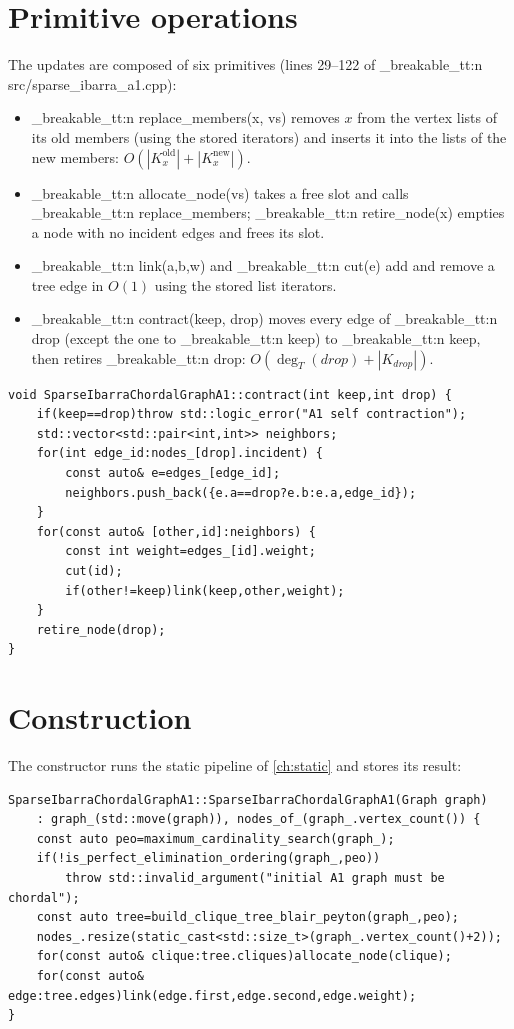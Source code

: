 \documentclass[11pt,a4paper,oneside]{report}
\theoremstyle{plain}
\theoremstyle{definition}
\theoremstyle{remark}
\DeclareRobustCommand{\code}[1]{\mtp_breakable_tt:n {#1}}
\DeclareRobustCommand{\file}[1]{\mtp_breakable_tt:n {#1}}
\begin{document}
\section{Primitive operations}
The updates are composed of six primitives (lines 29--122 of \file{src/sparse_ibarra_a1.cpp}):
\begin{itemize}
\item \code{replace_members(x, vs)} removes \(x\) from the vertex lists of its old members
  (using the stored iterators) and inserts it into the lists of the new members:
  \(O(|K_x^{\text{old}}|+|K_x^{\text{new}}|)\).
\item \code{allocate_node(vs)} takes a free slot and calls \code{replace_members};
  \code{retire_node(x)} empties a node with no incident edges and frees its slot.
\item \code{link(a,b,w)} and \code{cut(e)} add and remove a tree edge in \(O(1)\) using the
  stored list iterators.
\item \code{contract(keep, drop)} moves every edge of \code{drop} (except the one to
  \code{keep}) to \code{keep}, then retires \code{drop}:
  \(O(\deg_T(\mathit{drop})+|K_{\mathit{drop}}|)\).
\end{itemize}

\begin{lstlisting}[style=cpp,firstnumber=109,caption={\file{src/sparse_ibarra_a1.cpp}, lines 109--122: contracting a tree edge.},label={lst:a1-contract}]
void SparseIbarraChordalGraphA1::contract(int keep,int drop) {
    if(keep==drop)throw std::logic_error("A1 self contraction");
    std::vector<std::pair<int,int>> neighbors;
    for(int edge_id:nodes_[drop].incident) {
        const auto& e=edges_[edge_id];
        neighbors.push_back({e.a==drop?e.b:e.a,edge_id});
    }
    for(const auto& [other,id]:neighbors) {
        const int weight=edges_[id].weight;
        cut(id);
        if(other!=keep)link(keep,other,weight);
    }
    retire_node(drop);
}
\end{lstlisting}

\section{Construction}
The constructor runs the static pipeline of \cref{ch:static} and stores its result:

\begin{lstlisting}[style=cpp,firstnumber=12,caption={\file{src/sparse_ibarra_a1.cpp}, lines 12--21: the A1 constructor.},label={lst:a1-ctor}]
SparseIbarraChordalGraphA1::SparseIbarraChordalGraphA1(Graph graph)
    : graph_(std::move(graph)), nodes_of_(graph_.vertex_count()) {
    const auto peo=maximum_cardinality_search(graph_);
    if(!is_perfect_elimination_ordering(graph_,peo))
        throw std::invalid_argument("initial A1 graph must be chordal");
    const auto tree=build_clique_tree_blair_peyton(graph_,peo);
    nodes_.resize(static_cast<std::size_t>(graph_.vertex_count()+2));
    for(const auto& clique:tree.cliques)allocate_node(clique);
    for(const auto& edge:tree.edges)link(edge.first,edge.second,edge.weight);
}
\end{lstlisting}
\end{document}
